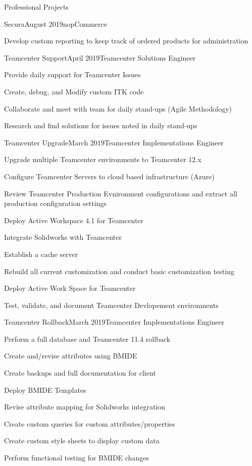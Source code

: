 \documentclass{resume} %
\begin{document}
\begin{rSection}{Professional Projects}
    \begin{rSubsection}{Secura}{August 2019}{nopCommerce}{}
        \item Develop custom reporting to keep track of ordered products for administration
    \end{rSubsection}
    
    \begin{rSubsection}{Teamcenter Support}{April 2019}{Teamcenter Solutions Engineer}{}
        \item Provide daily support for Teamcenter Issues
        \item Create, debug, and Modify custom ITK code
        \item Collaborate and meet with team for daily stand-ups (Agile Methodology)
        \item Research and find solutions for issues noted in daily stand-ups
    \end{rSubsection}
    
    \begin{rSubsection}{Teamcenter Upgrade}{March 2019}{Teamcenter Implementations Engineer}{}
        \item Upgrade multiple Teamcenter environments to Teamcenter 12.x
        \item Configure Teamcenter Servers to cloud based infrastructure (Azure)
        \item Review Teamcenter Production Evnironment configurations and extract all production configuration settings
        \item Deploy Active Workspace 4.1 for Teamcenter
        \item Integrate Solidworks with Teamcenter
        \item Establish a cache server 
        \item Rebuild all current customization and conduct basic customization testing 
        \item Deploy Active Work Space for Teamcenter
        \item Test, validate, and document Teamcenter Devlopement environments 
    \end{rSubsection}
    
    \begin{rSubsection}{Teamcenter Rollback}{March 2019}{Teamcenter Implementations Engineer}{}
        \item Perform a full database and Teamcenter 11.4 rollback
        \item Create and/revise attributes using BMIDE
        \item Create backups and full documentation for client
        \item Deploy BMIDE Templates
        \item Revise attribute mapping for Solidworks integration 
        \item Create custom queries for custom attributes/properties
        \item Create custom style sheets to display custom data
        \item Perform functional testing for BMIDE changes
    \end{rSubsection}
        

\end{rSection}
\end{document}
